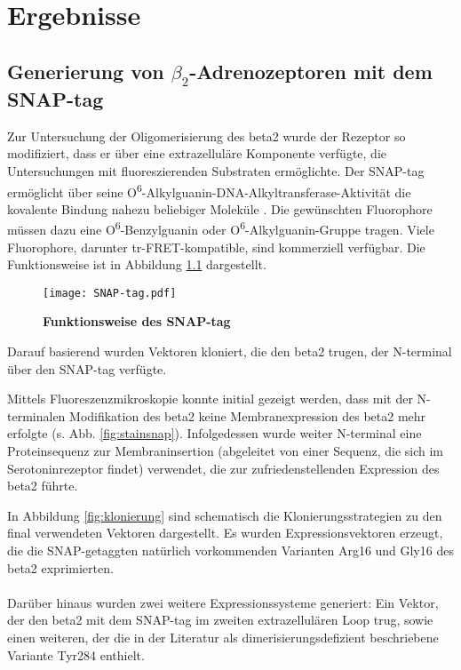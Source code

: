 \chapter{Ergebnisse} \label{chapter:ergebnisse}
\section{Generierung von $\beta_2$-Adrenozeptoren mit dem SNAP-tag} \label{klonierung}
Zur Untersuchung der Oligomerisierung des \gls{beta2} wurde der Rezeptor so modifiziert, dass er über eine extrazelluläre Komponente verfügte, die Untersuchungen mit fluoreszierenden Substraten ermöglichte. Der SNAP-tag ermöglicht über seine O\textsuperscript{6}-Alkylguanin-DNA-Alkyltransferase-Aktivität die kovalente Bindung nahezu beliebiger Moleküle \parencite{Gronemeyer2006}. Die gewünschten Fluorophore müssen dazu eine O\textsuperscript{6}-Benzylguanin oder O\textsuperscript{6}-Alkylguanin-Gruppe tragen. Viele Fluorophore, darunter tr-FRET-kompatible, sind kommerziell verfügbar. Die Funktionsweise ist in Abbildung \ref{fig:snap-tag} dargestellt.

\begin{figure}[htp]
    \texttt{[image: SNAP-tag.pdf]}
    \caption{\textbf{Funktionsweise des SNAP-tag}}
    \label{fig:snap-tag}
\end{figure}

Darauf basierend wurden Vektoren kloniert, die den \gls{beta2} trugen, der N-terminal über den SNAP-tag verfügte. 

Mittels Fluoreszenzmikroskopie konnte initial gezeigt werden, dass mit der N-terminalen Modifikation des \gls{beta2} keine Membranexpression des \gls{beta2} mehr erfolgte (s. Abb. \ref{fig:stainsnap}). Infolgedessen wurde weiter N-terminal eine Proteinsequenz zur Membraninsertion (abgeleitet von einer Sequenz, die sich im Serotoninrezeptor findet) verwendet, die zur zufriedenstellenden Expression des \gls{beta2} führte. 

In Abbildung \ref{fig:klonierung} sind schematisch die Klonierungsstrategien zu den final verwendeten Vektoren dargestellt. Es wurden Expressionsvektoren erzeugt, die die SNAP-getaggten natürlich vorkommenden Varianten Arg16 und Gly16 des \gls{beta2} exprimierten.
\\ \\ 
Darüber hinaus wurden zwei weitere Expressionssysteme generiert: Ein Vektor, der den \gls{beta2} mit dem SNAP-tag im zweiten extrazellulären Loop trug, sowie einen weiteren, der die in der Literatur als dimerisierungsdefizient beschriebene Variante Tyr284 \parencite{Salahpour2004} enthielt.

